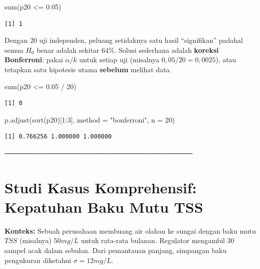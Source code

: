\documentclass[
  indonesian,
  letterpaper,
]{book}
\newenvironment{Shaded}{\begin{snugshade}}{\end{snugshade}}
\newcommand{\AttributeTok}[1]{\textcolor[rgb]{0.40,0.45,0.13}{#1}}
\newcommand{\DecValTok}[1]{\textcolor[rgb]{0.68,0.00,0.00}{#1}}
\newcommand{\FloatTok}[1]{\textcolor[rgb]{0.68,0.00,0.00}{#1}}
\newcommand{\FunctionTok}[1]{\textcolor[rgb]{0.28,0.35,0.67}{#1}}
\newcommand{\NormalTok}[1]{\textcolor[rgb]{0.00,0.23,0.31}{#1}}
\newcommand{\SpecialCharTok}[1]{\textcolor[rgb]{0.37,0.37,0.37}{#1}}
\newcommand{\StringTok}[1]{\textcolor[rgb]{0.13,0.47,0.30}{#1}}
\begin{document}
\begin{Shaded}
\begin{Highlighting}[]
\FunctionTok{sum}\NormalTok{(p20 }\SpecialCharTok{\textless{}=} \FloatTok{0.05}\NormalTok{)}
\end{Highlighting}
\end{Shaded}

\begin{verbatim}
[1] 1
\end{verbatim}

Dengan \(20\) uji independen, peluang setidaknya satu hasil
``signifikan'' padahal semua \(H_0\) benar adalah sekitar \(64\%\).
Solusi sederhana adalah \textbf{koreksi Bonferroni}: pakai \(\alpha/k\)
untuk setiap uji (misalnya \(0{,}05/20 = 0{,}0025\)), atau tetapkan satu
hipotesis utama \textbf{sebelum} melihat data.

\begin{Shaded}
\begin{Highlighting}[]
\FunctionTok{sum}\NormalTok{(p20 }\SpecialCharTok{\textless{}=} \FloatTok{0.05} \SpecialCharTok{/} \DecValTok{20}\NormalTok{)}
\end{Highlighting}
\end{Shaded}

\begin{verbatim}
[1] 0
\end{verbatim}

\begin{Shaded}
\begin{Highlighting}[]
\FunctionTok{p.adjust}\NormalTok{(}\FunctionTok{sort}\NormalTok{(p20)[}\DecValTok{1}\SpecialCharTok{:}\DecValTok{3}\NormalTok{], }\AttributeTok{method =} \StringTok{"bonferroni"}\NormalTok{, }\AttributeTok{n =} \DecValTok{20}\NormalTok{)}
\end{Highlighting}
\end{Shaded}

\begin{verbatim}
[1] 0.766256 1.000000 1.000000
\end{verbatim}

──────────────────────────────────────

\section{Studi Kasus Komprehensif: Kepatuhan Baku Mutu
TSS}\label{studi-kasus-komprehensif-kepatuhan-baku-mutu-tss}

\textbf{Konteks:} Sebuah perusahaan membuang air olahan ke sungai dengan
baku mutu \(TSS\) (misalnya) \textbf{\(50 mg/L\)} untuk rata-rata
bulanan. Regulator mengambil \(30\) sampel acak dalam sebulan. Dari
pemantauan panjang, simpangan baku pengukuran diketahui
\(\sigma = 12 mg/L\).
\end{document}

